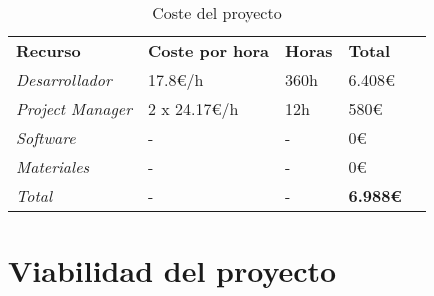 \begin{table}[H]
	\centering
	\begin{tabular}{l|l|l|l|l}
		\rowcolor{udcpink!25}
		\textbf{Recurso} & \textbf{Coste por hora} & \textbf{Horas} & \textbf{Total} \\
		\textit{Desarrollador} & 17.8€/h & 360h & 6.408€ \\
		\textit{Project Manager} & 2 x 24.17€/h & 12h & 580€ \\
		\textit{Software} & - & - & 0€ \\
		\textit{Materiales} & - & - & 0€ \\
		\textit{Total} & - & - & \textbf{6.988€} \\
	\end{tabular}
	\caption{Coste del proyecto}
	\label{tab:costes}
\end{table}

\section{Viabilidad del proyecto}

